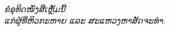 \vspace*{\fill}
\begin{center}
\fontsize{14pt}{22pt}\selectfont
\emph{ຂໍອຸທິດໜັງສືເຫຼັ້ມນີ້\\
ແກ່ຜູ້ທີ່ຫິວກະຫາຍ ແລະ ສະແຫວງຫາສັດຈະທຳ.}
\end{center}
